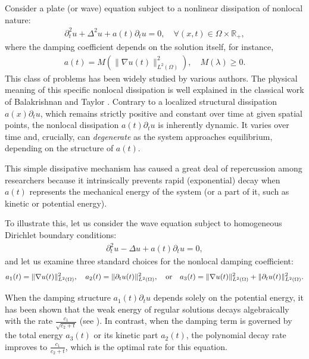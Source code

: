 \documentclass[11pt,reqno]{amsart}
\theoremstyle{remark}
\begin{document}
Consider a plate (or wave) equation subject to a nonlinear dissipation of nonlocal nature:
\begin{align*}
\partial_t^2u+\Delta^2u + a(t) \partial_t u =0, \quad \forall (x,t)\in\Omega \times \mathbb{R}_+,
\end{align*}
where the damping coefficient depends on the solution itself, for instance,
\begin{align*}
a(t)= M(\|\nabla u(t)\|_{L^2(\Omega)}^2),\quad M(\lambda)\geq 0.
\end{align*}
This class of problems has been widely studied by various authors. The physical meaning of this specific nonlocal dissipation is well explained in the classical work of Balakrishnan and Taylor \cite{Balakrishnan-Taylor}. Contrary to a localized structural dissipation $a(x) \partial_t u$, which remains strictly positive and constant over time at given spatial points, the nonlocal dissipation $a(t) \partial_t u$ is inherently dynamic. It varies over time and, crucially, can \textit{degenerate} as the system approaches equilibrium, depending on the structure of $a(t)$.

This simple dissipative mechanism has caused a great deal of repercussion among researchers because it intrinsically prevents rapid (exponential) decay when $a(t)$ represents the mechanical energy of the system (or a part of it, such as kinetic or potential energy).

To illustrate this, let us consider the wave equation subject to homogeneous Dirichlet boundary conditions:
\begin{align}\label{A}
\partial_t^2u-\Delta u+a(t)\partial_t u=0,
\end{align}
and let us examine three standard choices for the nonlocal damping coefficient:
\begin{align*}
a_1(t)=\|\nabla u(t)\|_{L^2(\Omega)}^2, \quad a_2(t)=\|\partial_t u(t)\|_{L^2(\Omega)}^2, \quad \hbox{or} \quad a_3(t)=\|\nabla u(t)\|_{L^2(\Omega)}^2+\|\partial_t u(t)\|_{L^2(\Omega)}^2.
\end{align*}

When the damping structure $a_1(t) \partial_t u$ depends solely on the potential energy, it has been shown that the weak energy of regular solutions decays algebraically with the rate $\frac{c_1}{\sqrt{c_2+t}}$ (see \cite{Cavalcanti2025}). In contrast, when the damping term is governed by the total energy $a_3(t)$ or its kinetic part $a_2(t)$, the polynomial decay rate improves to $\frac{c_1}{c_2+t}$, which is the optimal rate for this equation.
\end{document}
